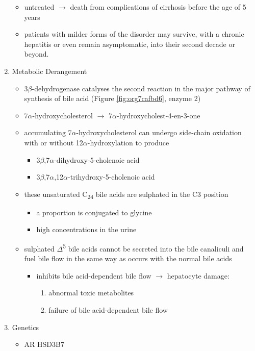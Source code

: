 \documentclass{scrartcl}
\begin{document}
\begin{enumerate}
\begin{itemize}
\item untreated \(\to\) death from complications of cirrhosis before the age
of 5 years
\item patients with milder forms of the disorder may survive, with a
chronic hepatitis or even remain asymptomatic, into their second
decade or beyond.
\end{itemize}
\item Metabolic Derangement
\label{sec:org5e9224a}
\begin{itemize}
\item 3\(\beta\)-dehydrogenase catalyses the second reaction in the major
pathway of synthesis of bile acid (Figure \ref{fig:org7cafbd6}, enzyme 2)
\item 7\(\alpha\)-hydroxycholesterol \(\to\) 7\(\alpha\)-hydroxycholest-4-en-3-one
\item accumulating 7\(\alpha\)-hydroxycholesterol can undergo side-chain
oxidation with or without 12\(\alpha\)-hydroxylation to produce
\begin{itemize}
\item 3\(\beta\),7\(\alpha\)-dihydroxy-5-cholenoic acid
\item 3\(\beta\),7\(\alpha\),12\(\alpha\)-trihydroxy-5-cholenoic acid
\end{itemize}
\item these unsaturated C\textsubscript{24} bile acids are sulphated in the C3 position
\begin{itemize}
\item a proportion is conjugated to glycine
\item high concentrations in the urine
\end{itemize}
\item sulphated \(\Delta\)\textsuperscript{5} bile acids cannot be secreted into the bile
canaliculi and fuel bile flow in the same way as occurs with the
normal bile acids
\begin{itemize}
\item inhibits bile acid-dependent bile flow \(\to\) hepatocyte damage:
\begin{enumerate}
\item abnormal toxic metabolites
\item failure of bile acid-dependent bile flow
\end{enumerate}
\end{itemize}
\end{itemize}

\item Genetics
\label{sec:org49ae817}
\begin{itemize}
\item AR HSD3B7
\end{itemize}


\end{enumerate}
\end{document}
